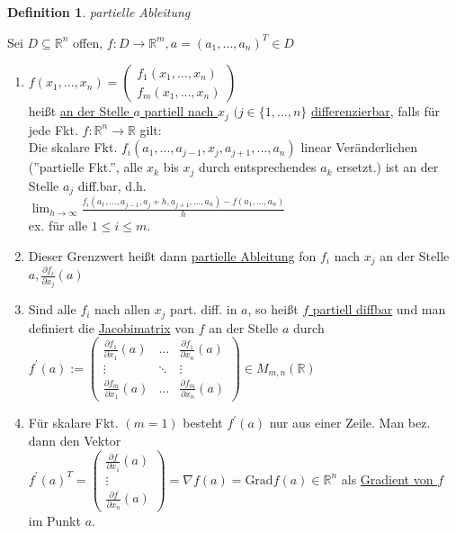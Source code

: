 \documentclass[a4paper,11pt]{article}
\newtheorem{definition}{Definition}[section]
\begin{document}
\begin{definition}
	partielle Ableitung
\end{definition}
Sei $D\subseteq \mathbb{R}^n$ offen, $f\colon D\to\mathbb{R}^m,a=(a_1,...,a_n)^T\in D$
\begin{enumerate}[label=\alph*)]
 	\item $f(x_1,...,x_n)=\begin{pmatrix}f_1(x_1,...,x_n)\\f_m(x_1,...,x_n)\end{pmatrix}$ \\
	heißt \underline{an der Stelle $a$ partiell nach $x_j$} $(j\in\{1,...,n\}$ \underline{differenzierbar}, falls für jede Fkt. $f\colon\mathbb{R}^n\to\mathbb{R}$ gilt: \\
	Die skalare Fkt. $f_i(a_1,...,a_{j-1},x_j,a_{j+1},...,a_n)$ linear Veränderlichen (''partielle Fkt.'', alle $x_k$ bis $x_j$ durch entsprechendes $a_k$ ersetzt.) ist an der Stelle $a_j$ diff.bar, d.h. \\
	$\lim_{h\to\infty}\frac{f_i(a_1,...,a_{j-1},a_j+h,a_{j+1},...,a_n)-f(a_1,...,a_n)}{h}$ \\
	ex. für alle $1\leq i\leq m$.
	\item Dieser Grenzwert heißt dann \underline{partielle Ableitung} fon $f_i$ nach $x_j$ an der Stelle $a,\frac{\partial f_i}{\partial x_j}(a)$
	\item Sind alle $f_i$ nach allen $x_j$ part. diff. in $a$, so heißt \underline{$f$ partiell diffbar} und man definiert die \underline{Jacobimatrix} von $f$ an der Stelle $a$ durch $f^\prime(a):=\begin{pmatrix}\frac{\partial f_1}{\partial x_1}(a) & \hdots & \frac{\partial f_1}{\partial x_n}(a) \\ \vdots & \ddots & \vdots \\ \frac{\partial f_m}{\partial x_1}(a) & \hdots & \frac{\partial f_m}{\partial x_n}(a)\end{pmatrix}\in M_{m,n}(\mathbb{R})$
	\item Für skalare Fkt. $(m=1)$ besteht $f^\prime(a)$ nur aus einer Zeile. Man bez. dann den Vektor \\
	$f^\prime(a)^T=\begin{pmatrix}\frac{\partial f}{\partial x_1}(a) \\ \vdots \\ \frac{\partial f}{\partial x_n}(a)\end{pmatrix}=\nabla f(a)=\text{Grad}f(a)\in\mathbb{R}^n$ als \underline{Gradient von $f$} im Punkt $a$.
\end{enumerate}
\end{document}

